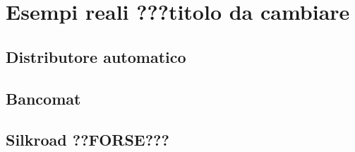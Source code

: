 \section{Esempi reali ???titolo da cambiare}

\subsection{Distributore automatico}

\subsection{Bancomat}

\subsection{Silkroad ??FORSE???}
